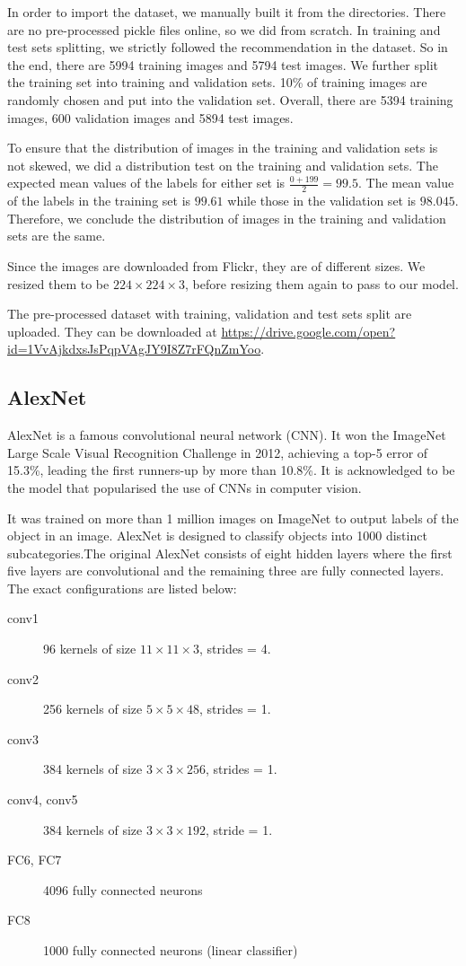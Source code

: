 \documentclass[letterpaper, 12pt]{article}
\begin{document}
In order to import the dataset, we manually built it from the directories. There are no pre-processed
pickle files online, so we did from scratch. In training and test sets splitting, we strictly followed
the recommendation in the dataset. So in the end, there are 5994 training images and 5794 test images.
We further split the training set into training and validation sets. 10\% of training images are randomly chosen
and put into the validation set. Overall, there are 5394 training images, 600 validation images and 5894 test images.

To ensure that the distribution of images in the training and validation sets is not skewed, we did a distribution test on the
training and validation sets. The expected mean values of the labels for either set is $\frac{0+199}{2}=99.5$. The mean value of
the labels in the training set is $99.61$ while those in the validation set is $98.045$. Therefore, we conclude the distribution
of images in the training and validation sets are the same.

Since the images are downloaded from Flickr, they are of different sizes. We resized them to be $224\times 224\times 3$, before
resizing them again to pass to our model.

The pre-processed dataset with training, validation and test sets split are uploaded. They can be downloaded at
\url{https://drive.google.com/open?id=1VvAjkdxsJsPqpVAgJY9I8Z7rFQnZmYoo}.

\subsection{AlexNet}
AlexNet \cite{Alex} is a famous convolutional neural network (CNN). It won the ImageNet Large Scale
Visual Recognition Challenge in 2012, achieving a top-5 error of 15.3\%, leading the first runners-up
by more than 10.8\%. It is acknowledged to be the model that popularised the use of CNNs in computer vision.

It was trained on more than 1 million images on ImageNet to output labels of the object in an image. AlexNet
is designed to classify objects into 1000 distinct subcategories.The original AlexNet consists of eight hidden layers where the first five
layers are convolutional and the remaining three are fully connected layers. The exact configurations
are listed below:
\begin{description}
	\item [conv1] 96 kernels of size $11 \times 11 \times 3$, strides = 4.
	\item [conv2] 256 kernels of size $5 \times 5 \times 48$, strides = 1.
	\item [conv3] 384 kernels of size $3 \times 3 \times 256$, strides = 1.
	\item [conv4, conv5] 384 kernels of size $3 \times 3 \times 192$, stride = 1.
	\item [FC6, FC7] 4096 fully connected neurons
    \item [FC8] 1000 fully connected neurons (linear classifier)
\end{description}
\end{document}
